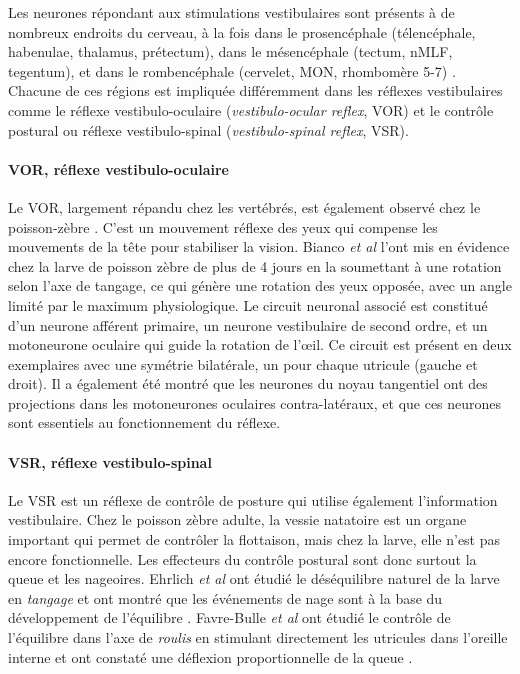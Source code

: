 Les neurones répondant aux stimulations vestibulaires sont présents à de nombreux endroits du cerveau, à la fois dans le prosencéphale (télencéphale, habenulae, thalamus, prétectum), dans le mésencéphale (tectum, nMLF, tegentum), et dans le rombencéphale (cervelet, MON, rhombomère 5-7) \cite{favre-bulle_cellular-resolution_2018}. Chacune de ces régions est impliquée différemment dans les réflexes vestibulaires comme le réflexe vestibulo-oculaire (\emph{vestibulo-ocular reflex}, VOR) et le contrôle postural ou réflexe vestibulo-spinal (\emph{vestibulo-spinal reflex}, VSR).

\paragraph{VOR, réflexe vestibulo-oculaire} \label{VOR}
Le VOR, largement répandu chez les vertébrés, est également observé chez le poisson-zèbre \cite{bianco_tangential_2012}. C'est un mouvement réflexe des yeux qui compense les mouvements de la tête pour stabiliser la vision. Bianco \emph{et al} l'ont mis en évidence chez la larve de poisson zèbre de plus de 4 jours en la soumettant à une rotation selon l'axe de tangage, ce qui génère une rotation des yeux opposée, avec un angle limité par le maximum physiologique. Le circuit neuronal associé est constitué d'un neurone afférent primaire, un neurone vestibulaire de second ordre, et un motoneurone oculaire qui guide la rotation de l’œil. Ce circuit est présent en deux exemplaires avec une symétrie bilatérale, un pour chaque utricule (gauche et droit). Il a également été montré que les neurones du noyau tangentiel ont des projections dans les motoneurones oculaires contra-latéraux, et que ces neurones sont essentiels au fonctionnement du réflexe. 

\paragraph{VSR, réflexe vestibulo-spinal} \label{VSR}
Le VSR est un réflexe de contrôle de posture qui utilise également l'information vestibulaire. Chez le poisson zèbre adulte, la vessie natatoire est un organe important qui permet de contrôler la flottaison, mais chez la larve, elle n'est pas encore fonctionnelle. Les effecteurs du contrôle postural sont donc surtout la queue et les nageoires. Ehrlich \emph{et al} ont étudié le déséquilibre naturel de la larve en \emph{tangage} et ont montré que les événements de nage sont à la base du développement de l'équilibre \cite{ehrlich_control_2017}. Favre-Bulle \emph{et al} ont étudié le contrôle de l'équilibre dans l'axe de \emph{roulis} en stimulant directement les utricules dans l'oreille interne et ont constaté une déflexion proportionnelle de la queue \cite{favre-bulle_cellular-resolution_2018}.

